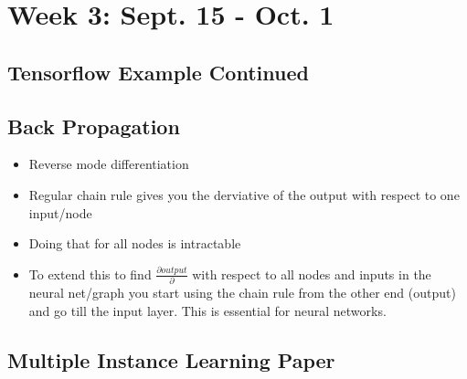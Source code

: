 \chapter{Week 3: Sept. 15 - Oct. 1}
\label{week:3}
\section{Tensorflow Example Continued}


\section{Back Propagation}
\begin{itemize}
	\item Reverse mode differentiation
	\item Regular chain rule gives you the derviative of the output with respect to one input/node
	\item Doing that for all nodes is intractable
	\item To extend this to find $\frac{\partial output}{\partial}$ with respect to all nodes and inputs in the neural net/graph you start using the chain rule from the other end (output) and go till the input layer. This is essential for neural networks. \cite{backprop}
\end{itemize}

\section{Multiple Instance Learning Paper}

